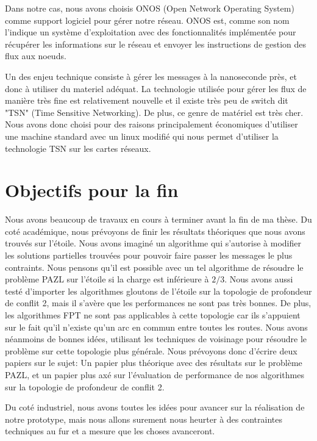\documentclass{article}
\begin{document}
Dans notre cas, nous avons choisis ONOS (Open Network Operating System) comme support logiciel pour gérer notre réseau. ONOS est, comme son nom l'indique un système d'exploitation avec des fonctionnalités implémentée pour récupérer les informations sur le réseau et envoyer les instructions de gestion des flux aux noeuds.

Un des enjeu technique consiste à gérer les messages à la nanoseconde près, et donc à utiliser du materiel adéquat. La technologie utilisée pour gérer les flux de manière très fine est relativement nouvelle et il existe très peu de switch dit "TSN" (Time Sensitive Networking). De plus, ce genre de matériel est très cher. Nous avons donc choisi pour des raisons principalement économiques d'utiliser une machine standard avec un linux modifié qui nous permet d'utiliser la technologie TSN sur les cartes réseaux.


\section{Objectifs pour la fin}

Nous avons beaucoup de travaux en cours à terminer avant la fin de ma thèse. Du coté académique, nous prévoyons de finir les résultats théoriques que nous avons trouvés sur l'étoile. Nous avons imaginé un algorithme qui s'autorise à modifier les solutions partielles trouvées pour pouvoir faire passer les messages le plus contraints. Nous pensons qu'il est possible avec un tel algorithme de résoudre le problème PAZL sur l'étoile si la charge est inférieure à $2/3$.
Nous avons aussi testé d'importer les algorithmes gloutons de l'étoile sur la topologie de profondeur de conflit 2, mais il s'avère que les performances ne sont pas très bonnes.  De plus, les algorithmes FPT ne sont pas applicables à cette topologie car ils s'appuient sur le fait qu'il n'existe qu'un arc en commun entre toutes les routes.
Nous avons néanmoins de bonnes idées, utilisant les techniques de voisinage pour résoudre le problème sur cette topologie plus générale.
Nous prévoyons donc d'écrire deux papiers sur le sujet: Un papier plus théorique avec des résultats sur le problème PAZL, et un papier plus axé sur l'évaluation de performance de nos algorithmes sur la topologie de profondeur de conflit 2.

Du coté industriel, nous avons toutes les idées pour avancer sur la réalisation de notre prototype, mais nous allons surement nous heurter à des contraintes techniques au fur et a mesure que les choses avanceront.


\end{document}
